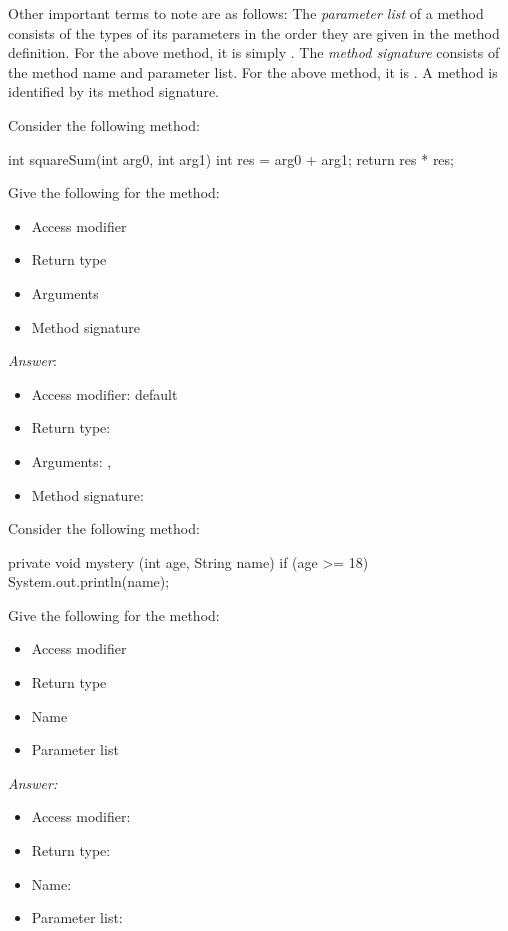 Other important terms to note are as follows:
The \emph{parameter list} of a method consists of the types of its parameters in the
order they are given in the method definition.
For the above method, it is simply .
The \emph{method signature} consists of the method name and parameter list.
For the above method, it is .
A method is identified by its method signature.

\begin{example}
Consider the following method:
\begin{code}
int squareSum(int arg0, int arg1) {
  int res = arg0 + arg1;
  return res * res;
}
\end{code}
Give the following for the method:
\begin{itemize}
\item Access modifier
\item Return type
\item Arguments
\item Method signature
\end{itemize}

\noindent \emph{Answer}: 
\begin{itemize}
\item Access modifier: default
\item Return type: 
\item Arguments: , 
\item Method signature: 
\end{itemize}
\end{example}

\begin{example}
Consider the following method:
\begin{code}
private void mystery (int age, String name) {
  if (age >= 18) {
    System.out.println(name);
  }
}
\end{code} 
Give the following for the method:
\begin{itemize}
\item Access modifier
\item Return type
\item Name
\item Parameter list
\end{itemize}

\noindent \emph{Answer:}
\begin{itemize}
\item Access modifier: 
\item Return type: 
\item Name: 
\item Parameter list: 
\end{itemize}

\end{example}

